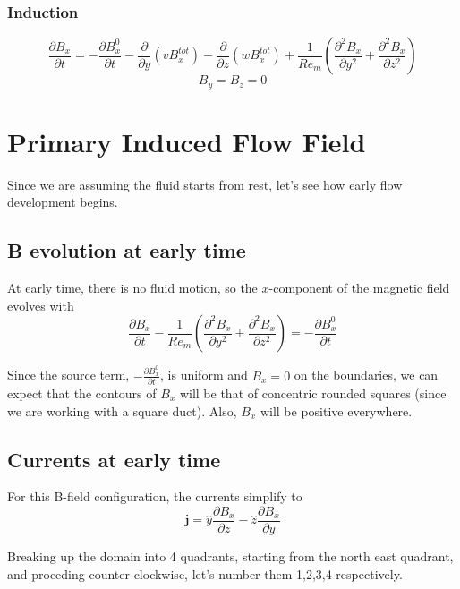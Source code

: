\documentclass[11pt]{article}
\begin{document}
\subsubsection{Induction}
\begin{equation}
	\frac{\partial B_x}{\partial t} 
	=
	- \frac{\partial B_x^0}{\partial t}
	- \frac{\partial}{\partial y} (v B_x^{tot})
	- \frac{\partial}{\partial z} (w B_x^{tot})
	+ \frac{1}{Re_m}
	\left(
	\frac{\partial^2 B_x}{\partial y^2}
	+
	\frac{\partial^2 B_x}{\partial z^2}
	\right)
\end{equation}
\begin{equation}
	B_y = B_z = 0
\end{equation}

\section{Primary Induced Flow Field}
Since we are assuming the fluid starts from rest, let's see how early flow development begins.

\subsection{B evolution at early time}
At early time, there is no fluid motion, so the $x$-component of the magnetic field evolves with
\begin{equation}
	\frac{\partial B_x}{\partial t} 
	- \frac{1}{Re_m}
	\left(
	\frac{\partial^2 B_x}{\partial y^2}
	+
	\frac{\partial^2 B_x}{\partial z^2}
	\right)
	=
	- \frac{\partial B_x^0}{\partial t}
\end{equation}

Since the source term, $- \frac{\partial B_x^0}{\partial t}$, is uniform and $B_x=0$ on the boundaries, we can expect that the contours of $B_x$ will be that of concentric rounded squares (since we are working with a square duct). Also, $B_x$ will be positive everywhere.

\subsection{Currents at early time}
For this B-field configuration, the currents simplify to
\begin{equation}
	\pmb{j}
	=
	\hat{y} \frac{\partial B_x}{\partial z}
	- \hat{z} \frac{\partial B_x}{\partial y}
\end{equation}

Breaking up the domain into 4 quadrants, starting from the north east quadrant, and proceding counter-clockwise, let's number them 1,2,3,4 respectively.
\end{document}
